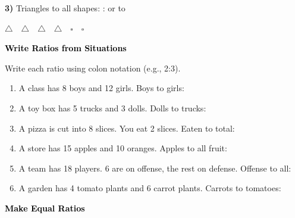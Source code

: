 \documentclass[12pt, letterpaper, fleqn]{article}
\newcommand{\blank}{\underline{\hspace{2.2cm}}}
\newcommand{\blankshorter}{\underline{\hspace{1.5cm}}}
\begin{document}
\noindent
\textbf{3)} Triangles to all shapes: \blank : \blank \quad or \quad \blankshorter \quad to \blankshorter

\begin{center}
$\triangle \quad \triangle \quad \triangle \quad \triangle \quad \square \quad \square$
\end{center}

\newpage

\begin{tcolorbox}[colback=customteal!20]
\large\textcolor{black}{\textbf{Write Ratios from Situations}}
\end{tcolorbox}

\noindent
Write each ratio using colon notation (e.g., 2:3).

\vspace{3mm}

\begin{enumerate}[itemsep=2.5cm, leftmargin=0.6cm]

\item A class has 8 boys and 12 girls. Boys to girls: \blank

\item A toy box has 5 trucks and 3 dolls. Dolls to trucks: \blank

\item A pizza is cut into 8 slices. You eat 2 slices. Eaten to total: \blank

\item A store has 15 apples and 10 oranges. Apples to all fruit: \blank

\item A team has 18 players. 6 are on offense, the rest on defense. Offense to all: \blank

\item A garden has 4 tomato plants and 6 carrot plants. Carrots to tomatoes: \blank

\end{enumerate}

\newpage

\begin{tcolorbox}[colback=customteal!20]
\large\textcolor{black}{\textbf{Make Equal Ratios}}
\end{tcolorbox}
\end{document}
